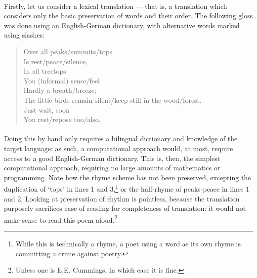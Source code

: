 \paragraph{}{Firstly, let us consider a lexical translation --- that
  is, a translation which considers only the basic preservation of
  words and their order. The following gloss was done using an
  English-German dictionary, with alternative words marked using
  slashes: \\}

  \begin{verse}
    Over all peaks\slash summits\slash tops \\
    Is rest\slash peace\slash silence, \\
    In all treetops \\
    You (informal) sense\slash feel \\
    Hardly a breath\slash breeze; \\
    The little birds remain silent\slash keep still in the wood\slash forest. \\
    Just wait, soon \\
    You rest\slash repose too\slash also. \\
  \end{verse}

  \paragraph{}{Doing this by hand only requires a bilingual dictionary
    and knowledge of the target language: as such, a computational
    approach would, at most, require access to a good English-German
    dictionary. This is, then, the simplest computational approach,
    requiring no large amounts of mathematics or programming. Note how
    the rhyme scheme has not been preserved, excepting the duplication
    of `tops' in lines 1 and 3,\footnote{While this is technically a
      rhyme, a poet using a word as its own rhyme is committing a
      crime against poetry.} or the half-rhyme of peaks-peace in lines
    1 and 2. Looking at preservation of rhythm is pointless, because
    the translation purposely sacrifices ease of reading for
    completeness of translation: it would not make sense to read this
    poem aloud.\footnote{Unless one is E.E. Cummings, in which case it
      is fine.}}

